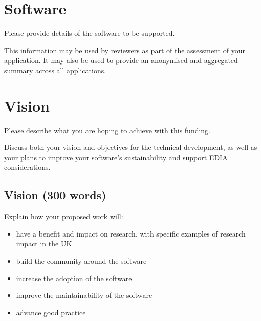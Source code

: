 \documentclass[12pt]{article}
\newenvironment{instruction}{%
    \begin{tcolorbox}[colback=red!5,colframe=red,title=Instruction]%
}{%
    \end{tcolorbox}%
}
\begin{document}
\pagebreak

\section*{Software}

\begin{instruction}

Please provide details of the software to be supported.

This information may be used by reviewers as part of the assessment of your application. It may also be used to provide an anonymised and aggregated summary across all applications.

\end{instruction}



\pagebreak

\section*{Vision}

\begin{instruction}

Please describe what you are hoping to achieve with this funding.

Discuss both your vision and objectives for the technical development, as well as your plans to improve your software's sustainability and support EDIA considerations.

\end{instruction}

\subsection*{Vision (300 words)}

\begin{instruction}

Explain how your proposed work will:

\begin{itemize}
    \item have a benefit and impact on research, with specific examples of research impact in the UK
    \item build the community around the software
    \item increase the adoption of the software
    \item improve the maintainability of the software
    \item advance good practice
\end{itemize}

\end{instruction}
\end{document}
